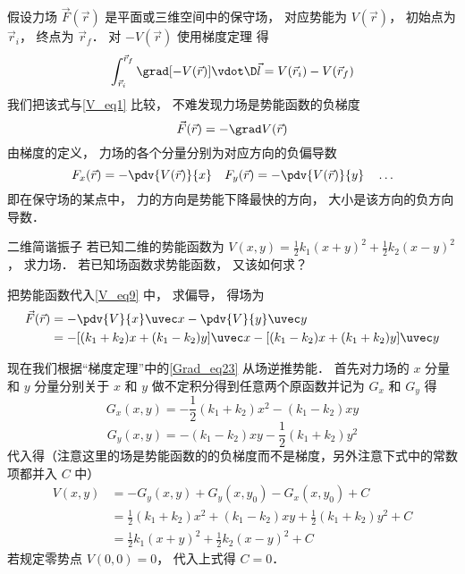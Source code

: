 假设力场 $\vec F(\vec r)$ 是平面或三维空间中的保守场， 对应势能为 $V(\vec r)$， 初始点为 $\vec r_i$， 终点为 $\vec r_f$． 对 $-V(\vec r)$ 使用梯度定理 得
\begin{equation}
\int_{\vec r_i}^{\vec r_f} \grad [-V(\vec r)] \vdot \D \vec l = V(\vec r_i) - V(\vec r_f)
\end{equation}
我们把该式与\autoref{V_eq1} 比较， 不难发现力场是势能函数的负梯度
\begin{equation}
\vec F(\vec r) = - \grad V(\vec r)
\end{equation}
由梯度的定义， 力场的各个分量分别为对应方向的负偏导数
\begin{equation}\label{V_eq9}
F_x(\vec r) = -\pdv{V(\vec r)}{x} \quad F_y(\vec r) = -\pdv{V(\vec r)}{y} \quad \ldots
\end{equation}
即在保守场的某点中， 力的方向是势能下降最快的方向， 大小是该方向的负方向导数．

\begin{exam}{二维简谐振子}
若已知二维的势能函数为 $V(x,y) = \frac 12 k_1 (x+y)^2 + \frac 12 k_2 (x-y)^2$， 求力场． 若已知场函数求势能函数， 又该如何求？

把势能函数代入\autoref{V_eq9} 中， 求偏导， 得场为
\begin{equation}\begin{aligned}
\vec F(\vec r) &= -\pdv{V}{x} \uvec x - \pdv{V}{y} \uvec y\\
&= -[(k_1 + k_2) x  + (k_1-k_2) y] \uvec x - [(k_1-k_2)x + (k_1+k_2)y] \uvec y
\end{aligned}\end{equation}

现在我们根据“梯度定理”中的\autoref{Grad_eq23} 从场逆推势能． 首先对力场的 $x$ 分量和 $y$ 分量分别关于 $x$ 和 $y$ 做不定积分得到任意两个原函数并记为 $G_x$ 和 $G_y$ 得
\begin{equation}
G_x(x,y) = - \frac 12 (k_1 + k_2) x^2 -  (k_1-k_2) xy
\end{equation}
\begin{equation}
G_y(x,y) =  - (k_1 - k_2) xy - \frac 12 (k_1+k_2) y^2
\end{equation}
代入得（注意这里的场是势能函数的的负梯度而不是梯度，另外注意下式中的常数项都并入 $C$ 中）
\begin{equation}\begin{aligned}
V(x,y) &= -G_y(x,y) + G_y(x,y_0) - G_x(x,y_0) + C\\
&= \frac 12 (k_1 + k_2) x^2 + (k_1-k_2)xy + \frac 12 (k_1+k_2) y^2 + C\\
&= \frac 12 k_1 (x+y)^2 +\frac 12 k_2 (x-y)^2 + C
\end{aligned}\end{equation}
若规定零势点 $V(0,0) = 0$， 代入上式得 $C=0$．
\end{exam}

